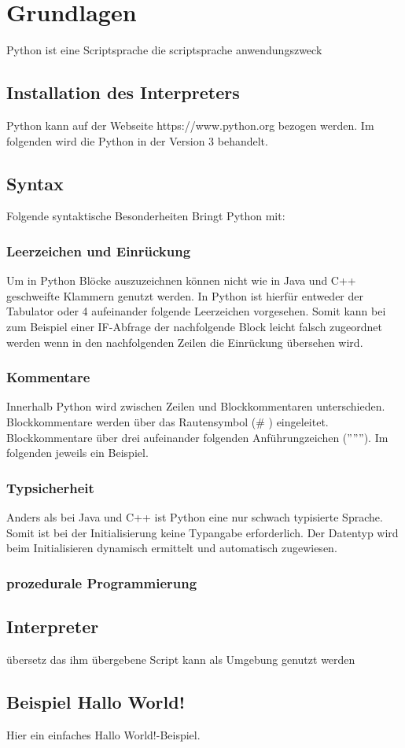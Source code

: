 
\section{Grundlagen}
Python ist eine Scriptsprache die 
scriptsprache
anwendungszweck

\subsection{Installation des Interpreters}
Python kann auf der Webseite https://www.python.org bezogen werden.
Im folgenden wird die Python in der Version 3 behandelt.





\subsection{Syntax}
Folgende syntaktische Besonderheiten Bringt Python mit:
\subsubsection{Leerzeichen und Einrückung}
Um in Python Blöcke auszuzeichnen können nicht wie in Java und C++ geschweifte Klammern genutzt werden. 
In Python ist hierfür entweder der Tabulator oder 4 aufeinander folgende Leerzeichen vorgesehen.
Somit kann bei zum Beispiel einer IF-Abfrage der nachfolgende Block leicht falsch zugeordnet werden wenn in den nachfolgenden Zeilen die Einrückung übersehen wird.
\subsubsection{Kommentare}
Innerhalb Python wird zwischen Zeilen und Blockkommentaren unterschieden.
Blockkommentare werden über das Rautensymbol (\# ) eingeleitet.
Blockkommentare über drei aufeinander folgenden Anführungzeichen ('''''').
Im folgenden jeweils ein Beispiel.

\subsubsection{Typsicherheit}
Anders als bei Java und C++ ist Python eine nur schwach typisierte Sprache.
Somit ist bei der Initialisierung keine Typangabe erforderlich. 
Der Datentyp wird beim Initialisieren dynamisch ermittelt und automatisch zugewiesen.
\subsubsection{prozedurale Programmierung}
\subsection{Interpreter}
übersetz das ihm übergebene Script
kann als Umgebung genutzt werden


\subsection{Beispiel \glqq Hallo World!\grqq}
Hier ein einfaches \glqq Hallo World!\grqq -Beispiel.



